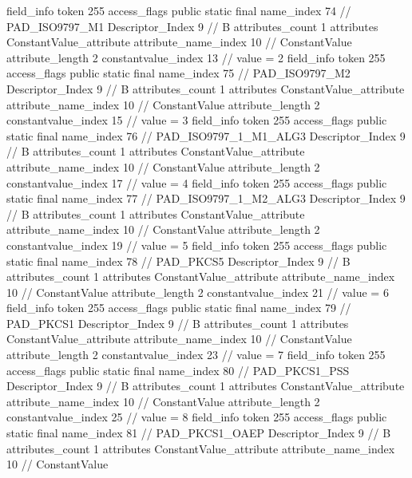 {{{{{{{				}
				}
			}
			field_info {
				token	255
				access_flags	public static final
				name_index	74		// PAD_ISO9797_M1
				Descriptor_Index	9		// B
				attributes_count	1
				attributes {
				ConstantValue_attribute {
					attribute_name_index	10		// ConstantValue
					attribute_length	2
					constantvalue_index	13		// value = 2
				}
				}
			}
			field_info {
				token	255
				access_flags	public static final
				name_index	75		// PAD_ISO9797_M2
				Descriptor_Index	9		// B
				attributes_count	1
				attributes {
				ConstantValue_attribute {
					attribute_name_index	10		// ConstantValue
					attribute_length	2
					constantvalue_index	15		// value = 3
				}
				}
			}
			field_info {
				token	255
				access_flags	public static final
				name_index	76		// PAD_ISO9797_1_M1_ALG3
				Descriptor_Index	9		// B
				attributes_count	1
				attributes {
				ConstantValue_attribute {
					attribute_name_index	10		// ConstantValue
					attribute_length	2
					constantvalue_index	17		// value = 4
				}
				}
			}
			field_info {
				token	255
				access_flags	public static final
				name_index	77		// PAD_ISO9797_1_M2_ALG3
				Descriptor_Index	9		// B
				attributes_count	1
				attributes {
				ConstantValue_attribute {
					attribute_name_index	10		// ConstantValue
					attribute_length	2
					constantvalue_index	19		// value = 5
				}
				}
			}
			field_info {
				token	255
				access_flags	public static final
				name_index	78		// PAD_PKCS5
				Descriptor_Index	9		// B
				attributes_count	1
				attributes {
				ConstantValue_attribute {
					attribute_name_index	10		// ConstantValue
					attribute_length	2
					constantvalue_index	21		// value = 6
				}
				}
			}
			field_info {
				token	255
				access_flags	public static final
				name_index	79		// PAD_PKCS1
				Descriptor_Index	9		// B
				attributes_count	1
				attributes {
				ConstantValue_attribute {
					attribute_name_index	10		// ConstantValue
					attribute_length	2
					constantvalue_index	23		// value = 7
				}
				}
			}
			field_info {
				token	255
				access_flags	public static final
				name_index	80		// PAD_PKCS1_PSS
				Descriptor_Index	9		// B
				attributes_count	1
				attributes {
				ConstantValue_attribute {
					attribute_name_index	10		// ConstantValue
					attribute_length	2
					constantvalue_index	25		// value = 8
				}
				}
			}
			field_info {
				token	255
				access_flags	public static final
				name_index	81		// PAD_PKCS1_OAEP
				Descriptor_Index	9		// B
				attributes_count	1
				attributes {
				ConstantValue_attribute {
					attribute_name_index	10		// ConstantValue
}}}}}}}
